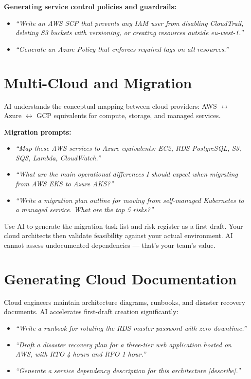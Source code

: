 \textbf{Generating service control policies and guardrails:}
\begin{itemize}
  \item \textit{``Write an AWS SCP that prevents any IAM user from disabling CloudTrail, deleting S3 buckets with versioning, or creating resources outside eu-west-1.''}
  \item \textit{``Generate an Azure Policy that enforces required tags on all resources.''}
\end{itemize}

\section{Multi-Cloud and Migration}
\label{sec:multi-cloud}

AI understands the conceptual mapping between cloud providers:
AWS $\leftrightarrow$ Azure $\leftrightarrow$ GCP equivalents for compute, storage,
and managed services.

\textbf{Migration prompts:}
\begin{itemize}
  \item \textit{``Map these AWS services to Azure equivalents: EC2, RDS PostgreSQL, S3, SQS, Lambda, CloudWatch.''}
  \item \textit{``What are the main operational differences I should expect when migrating from AWS EKS to Azure AKS?''}
  \item \textit{``Write a migration plan outline for moving from self-managed Kubernetes to a managed service. What are the top 5 risks?''}
\end{itemize}

\begin{tipbox}
Use AI to generate the migration task list and risk register as a first draft.
Your cloud architects then validate feasibility against your actual environment.
AI cannot assess undocumented dependencies --- that's your team's value.
\end{tipbox}

\section{Generating Cloud Documentation}
\label{sec:cloud-docs}

Cloud engineers maintain architecture diagrams, runbooks, and disaster recovery
documents.
AI accelerates first-draft creation significantly:

\begin{itemize}
  \item \textit{``Write a runbook for rotating the RDS master password with zero downtime.''}
  \item \textit{``Draft a disaster recovery plan for a three-tier web application hosted on AWS, with RTO 4 hours and RPO 1 hour.''}
  \item \textit{``Generate a service dependency description for this architecture [describe].''}
\end{itemize}
